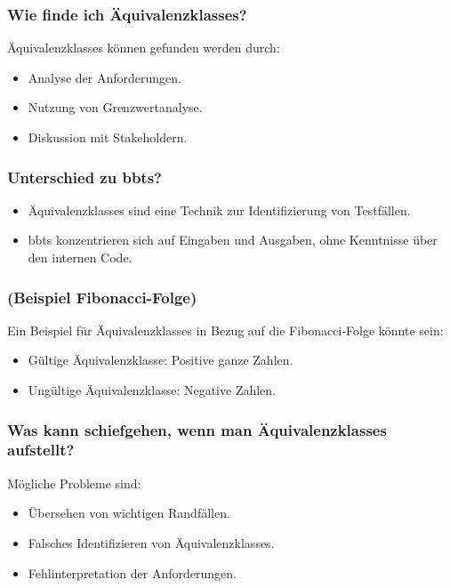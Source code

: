 \documentclass[main.tex]{subfiles}
\begin{document}
\subsubsection*{Wie finde ich \glspl{Äquivalenzklasse}?}
\glspl{Äquivalenzklasse} können gefunden werden durch:
\begin{itemize}
    \item Analyse der Anforderungen.
    \item Nutzung von Grenzwertanalyse.
    \item Diskussion mit Stakeholdern.
\end{itemize}


\subsubsection*{Unterschied zu \glspl{bbt}?}
\begin{itemize}
    \item \glspl{Äquivalenzklasse} sind eine Technik zur Identifizierung von Testfällen.
    \item \glspl{bbt} konzentrieren sich auf Eingaben und Ausgaben, ohne Kenntnisse über den internen Code.
\end{itemize}


\subsubsection*{(Beispiel Fibonacci-Folge)}
Ein Beispiel für \glspl{Äquivalenzklasse} in Bezug auf die Fibonacci-Folge könnte sein:
\begin{itemize}
    \item Gültige Äquivalenzklasse: Positive ganze Zahlen.
    \item Ungültige Äquivalenzklasse: Negative Zahlen.
\end{itemize}



\subsubsection*{Was kann schiefgehen, wenn man \glspl{Äquivalenzklasse} aufstellt?}
Mögliche Probleme sind:
\begin{itemize}
    \item Übersehen von wichtigen Randfällen.
    \item Falsches Identifizieren von \glspl{Äquivalenzklasse}.
    \item Fehlinterpretation der Anforderungen.
\end{itemize}
\end{document}
